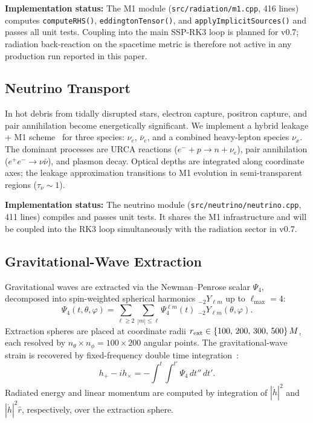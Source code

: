 \documentclass[aps,prd,twocolumn,superscriptaddress,nofootinbib,showpacs,
               longbibliography]{revtex4-2}
\newcommand{\code}[1]{\texttt{#1}}
\begin{document}
\textbf{Implementation status:} The M1 module (\code{src/radiation/m1.cpp},
416 lines) computes \code{computeRHS()}, \code{eddingtonTensor()}, and
\code{applyImplicitSources()} and passes all unit tests.
Coupling into the main SSP-RK3 loop is planned for v0.7; radiation back-reaction
on the spacetime metric is therefore not active in any production run reported
in this paper.

\subsection{Neutrino Transport}
\label{sec:neutrino_formalism}

In hot debris from tidally disrupted stars, electron capture, positron
capture, and pair annihilation become energetically significant.
We implement a hybrid leakage + M1 scheme~\cite{Ruffert1996,Perego2016} for
three species: $\nu_e$, $\bar\nu_e$, and a combined heavy-lepton species
$\nu_x$.
The dominant processes are URCA reactions ($e^- + p \to n + \nu_e$), pair
annihilation ($e^+e^- \to \nu\bar\nu$), and plasmon decay.
Optical depths are integrated along coordinate axes; the leakage approximation
transitions to M1 evolution in semi-transparent regions ($\tau_\nu \sim 1$).

\textbf{Implementation status:} The neutrino module (\code{src/neutrino/neutrino.cpp},
411 lines) compiles and passes unit tests.
It shares the M1 infrastructure and will be coupled into the RK3 loop
simultaneously with the radiation sector in v0.7.

\subsection{Gravitational-Wave Extraction}
\label{sec:gw_formalism}

Gravitational waves are extracted via the Newman--Penrose scalar $\Psi_4$,
decomposed into spin-weighted spherical harmonics
${}_{-2}Y_{\ell m}$ up to $\ell_{\max} = 4$:
\begin{equation}
  \Psi_4(t,\theta,\varphi) = \sum_{\ell\geq 2}\sum_{|m|\leq\ell}
    \Psi_4^{\ell m}(t)\;{}_{-2}Y_{\ell m}(\theta,\varphi).
\end{equation}
Extraction spheres are placed at coordinate radii
$r_{\rm ext} \in \{100,\,200,\,300,\,500\}\,M$, each resolved by
$n_\theta \times n_\phi = 100 \times 200$ angular points.
The gravitational-wave strain is recovered by fixed-frequency
double time integration~\cite{ReisswigPollney2011}:
\begin{equation}
  h_+ - ih_\times = -\int^t\!\!\int^{t'} \Psi_4\,dt''\,dt'.
\end{equation}
Radiated energy and linear momentum are computed by integration of
$|\dot{h}|^2$ and $|\dot{h}|^2\hat{r}$, respectively, over the extraction
sphere.
\end{document}
